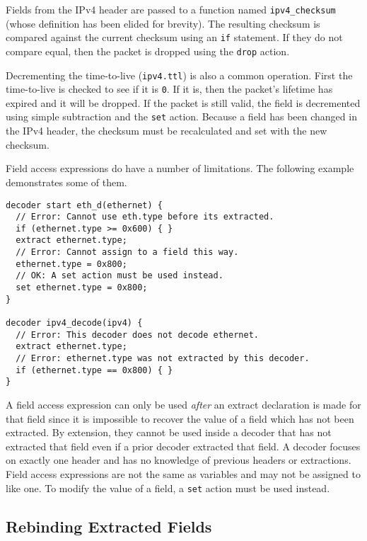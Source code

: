 Fields from the IPv4 header are passed to a function named 
\texttt{ipv4\_checksum} (whose definition has been elided for brevity). The 
resulting checksum is compared against the current checksum using an \texttt{if} 
statement. If they do not compare equal, then the packet is dropped using the 
\texttt{drop} action.

Decrementing the time-to-live (\texttt{ipv4.ttl}) is also a common operation. 
First the time-to-live is checked to see if it is \texttt{0}. If it is, then the 
packet's lifetime has expired and it will be dropped. If the packet is still 
valid, the field is decremented using simple subtraction and the 
\texttt{set} action. Because a field has been changed in the IPv4 
header, the checksum must be recalculated and set with the new checksum.

Field access expressions do have a number of limitations. The following example
demonstrates some of them.

\begin{codepage}
\begin{lstlisting}
decoder start eth_d(ethernet) {
  // Error: Cannot use eth.type before its extracted.
  if (ethernet.type >= 0x600) { }
  extract ethernet.type;
  // Error: Cannot assign to a field this way.
  ethernet.type = 0x800;
  // OK: A set action must be used instead.
  set ethernet.type = 0x800;
}

decoder ipv4_decode(ipv4) {
  // Error: This decoder does not decode ethernet.
  extract ethernet.type;
  // Error: ethernet.type was not extracted by this decoder.
  if (ethernet.type == 0x800) { }
}
\end{lstlisting}
\end{codepage}

A field access expression can only be used \textit{after} an extract declaration
is made for that field since it is impossible to recover the value of a
field which has not been extracted. By extension, they cannot be used inside a
decoder that has not extracted that field even if a prior decoder extracted that field. A decoder focuses on exactly one
header and has no knowledge of previous headers or extractions.
Field access expressions are not the same as variables and may not be assigned to like one. To modify the
value of a field, a \texttt{set} action must be used instead.

\subsection{Rebinding Extracted Fields}

